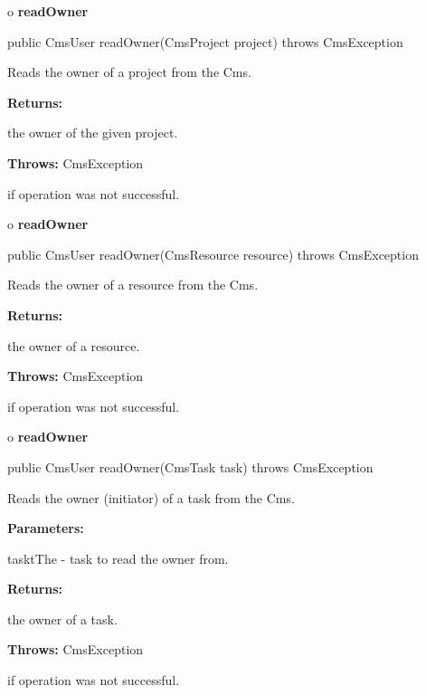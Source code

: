 o {\bf readOwner} 

\begin{PRE}
 public CmsUser readOwner(CmsProject project) throws CmsException
\end{PRE}

\begin{description}
\htmlDD Reads the owner of a project from the Cms. 

\begin{description}
\item {\bf Returns:}  

the owner of the given project.  
\item {\bf Throws:} CmsException  

if operation was not successful.  
\end{description}

\end{description}

o {\bf readOwner} 

\begin{PRE}
 public CmsUser readOwner(CmsResource resource) throws CmsException
\end{PRE}

\begin{description}
\htmlDD Reads the owner of a resource from the Cms. 

\begin{description}
\item {\bf Returns:}  

the owner of a resource.  
\item {\bf Throws:} CmsException  

if operation was not successful.  
\end{description}

\end{description}

o {\bf readOwner} 

\begin{PRE}
 public CmsUser readOwner(CmsTask task) throws CmsException
\end{PRE}

\begin{description}
\htmlDD Reads the owner (initiator) of a task from the Cms. 

\begin{description}
\item {\bf Parameters:}  

tasktThe - task to read the owner from.  
\item {\bf Returns:}  

the owner of a task.  
\item {\bf Throws:} CmsException  

if operation was not successful.  
\end{description}

\end{description}

